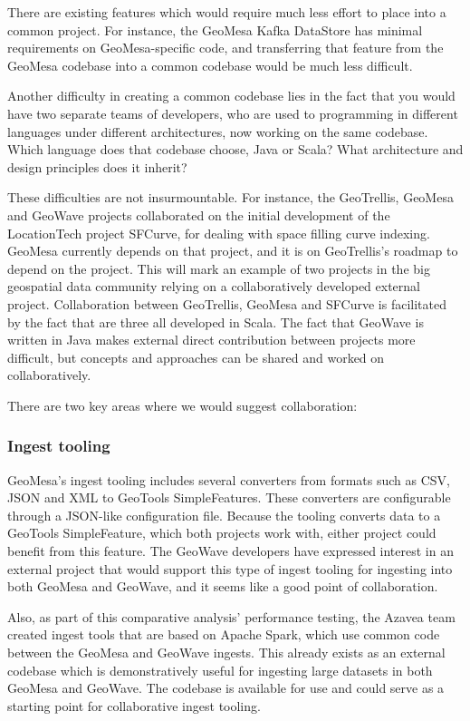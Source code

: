 There are existing features which would require much less effort to place into a common project.
For instance, the GeoMesa Kafka DataStore has minimal requirements on GeoMesa-specific code, and transferring that feature from the GeoMesa codebase into a common codebase would be much less difficult.

Another difficulty in creating a common codebase lies in the fact that you would have two separate teams of developers, who are used to programming in different languages under different architectures, now working on the same codebase.
Which language does that codebase choose, Java or Scala? What architecture and design principles does it inherit?

These difficulties are not insurmountable.
For instance, the GeoTrellis, GeoMesa and GeoWave projects collaborated on the initial development of the LocationTech project SFCurve, for dealing with space filling curve indexing.
GeoMesa currently depends on that project, and it is on GeoTrellis's roadmap to depend on the project.
This will mark an example of two projects in the big geospatial data community relying on a collaboratively developed external project.
Collaboration between GeoTrellis, GeoMesa and SFCurve is facilitated by the fact that are three all developed in Scala.
The fact that GeoWave is written in Java makes external direct contribution between projects more difficult, but concepts and approaches can be shared and worked on collaboratively.

There are two key areas where we would suggest collaboration:


\subsubsection{Ingest tooling}
\label{sec:conclusions:collaboration:ingest}

GeoMesa's ingest tooling includes several converters from formats such as CSV, JSON and XML to GeoTools SimpleFeatures.
These converters are configurable through a JSON-like configuration file.
Because the tooling converts data to a GeoTools SimpleFeature, which both projects work with, either project could benefit from this feature.
The GeoWave developers have expressed interest in an external project that would support this type of ingest tooling for ingesting into both GeoMesa and GeoWave, and it seems like a good point of collaboration.

Also, as part of this comparative analysis' performance testing, the Azavea team created ingest tools that are based on Apache Spark, which use common code between the GeoMesa and GeoWave ingests.
This already exists as an external codebase which is demonstratively useful for ingesting large datasets in both GeoMesa and GeoWave.
The codebase is available for use and could serve as a starting point for collaborative ingest tooling.



